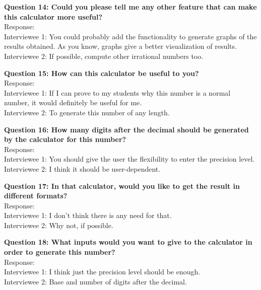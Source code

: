 \documentclass[paper=a4, fontsize=11pt]{report}
\numberwithin{equation}{section}		%
\numberwithin{figure}{section}			%
\numberwithin{table}{section}				%
\begin{document}
\begin{flushleft}
\setlength{\parskip}{\baselineskip}
\textbf{Question 14: Could you please tell me any other feature that can make this calculator more useful?}
\\Response:
\\Interviewee 1: You could probably add the functionality to generate graphs of the results obtained. As you know, graphs give a better visualization of results.
\\Interviewee 2: If possible, compute other irrational numbers too.
\\\hrulefill
\end{flushleft}

\begin{flushleft}
\setlength{\parskip}{\baselineskip}
\textbf{Question 15: How can this calculator be useful to you?}
\\Response:
\\Interviewee 1: If I can prove to my students why this number is a normal number, it would definitely be useful for me.
\\Interviewee 2: To generate this number of any length.
\\\hrulefill
\end{flushleft}

\begin{flushleft}
\setlength{\parskip}{\baselineskip}
\textbf{Question 16: How many digits after the decimal should be generated by the calculator for this number?}
\\Response:
\\Interviewee 1: You should give the user the flexibility to enter the precision level.
\\Interviewee 2: I think it should be user-dependent.
\\\hrulefill
\end{flushleft}

\begin{flushleft}
\setlength{\parskip}{\baselineskip}
\textbf{Question 17: In that calculator, would you like to get the result in different formats?}
\\Response:
\\Interviewee 1: I don't think there is any need for that.
\\Interviewee 2: Why not, if possible.
\\\hrulefill
\end{flushleft}

\begin{flushleft}
\setlength{\parskip}{\baselineskip}
\textbf{Question 18: What inputs would you want to give to the calculator in order to generate this number?}
\\Response:
\\Interviewee 1: I think just the precision level should be enough.
\\Interviewee 2: Base and number of digits after the decimal.
\\\hrulefill
\end{flushleft}
\end{document}
